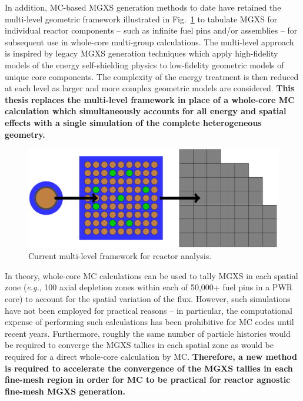 \documentclass[12pt,twoside]{mitthesis-exec}
\begin{document}
In addition, MC-based MGXS generation methods to date have retained the multi-level geometric framework illustrated in Fig.~\ref{fig:multi-level-flow-chart} to tabulate MGXS for individual reactor components -- such as infinite fuel pins and/or assemblies -- for subsequent use in whole-core multi-group calculations. The multi-level approach is inspired by legacy MGXS generation techniques which apply high-fidelity models of the energy self-shielding physics to low-fidelity geometric models of unique core components. The complexity of the energy treatment is then reduced at each level as larger and more complex geometric models are considered. \textbf{This thesis replaces the multi-level framework in place of a whole-core MC calculation which simultaneously accounts for all energy and spatial effects with a single simulation of the complete heterogeneous geometry.}

\begin{figure}[h!]
\centering
\includegraphics[width=0.9\linewidth]{figures/intro/multi-step-flow-chart}
\caption[Multi-level approach to reactor analysis]{Current multi-level framework for reactor analysis.}
\label{fig:multi-level-flow-chart}
\end{figure}

In theory, whole-core MC calculations can be used to tally MGXS in each spatial zone (\textit{e.g.}, 100 axial depletion zones within each of 50,000+ fuel pins in a PWR core) to account for the spatial variation of the flux. However, such simulations have not been employed for practical reasons -- in particular, the computational expense of performing such calculations has been prohibitive for MC codes until recent years. Furthermore, roughly the same number of particle histories would be required to converge the MGXS tallies in each spatial zone as would be required for a direct whole-core calculation by MC. \textbf{Therefore, a new method is required to accelerate the convergence of the MGXS tallies in each fine-mesh region in order for MC to be practical for reactor agnostic fine-mesh MGXS generation.}
\end{document}
